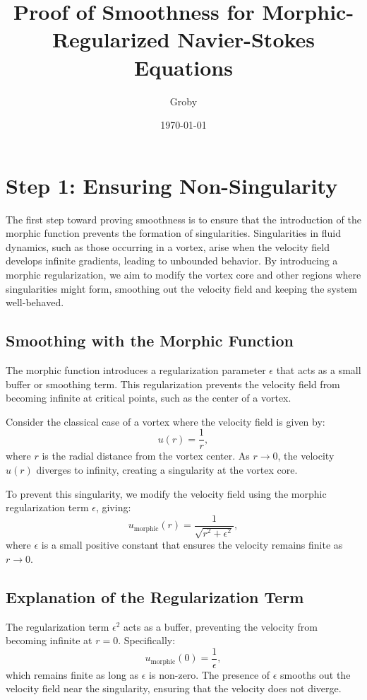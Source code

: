 \documentclass{article}
\title{Proof of Smoothness for Morphic-Regularized Navier-Stokes Equations}
\author{Groby}
\date{\today}
\begin{document}
\maketitle
\section*{Step 1: Ensuring Non-Singularity}

The first step toward proving smoothness is to ensure that the introduction of the morphic function prevents the formation of singularities. Singularities in fluid dynamics, such as those occurring in a vortex, arise when the velocity field develops infinite gradients, leading to unbounded behavior. By introducing a morphic regularization, we aim to modify the vortex core and other regions where singularities might form, smoothing out the velocity field and keeping the system well-behaved.

\subsection*{Smoothing with the Morphic Function}

The morphic function introduces a regularization parameter \( \epsilon \) that acts as a small buffer or smoothing term. This regularization prevents the velocity field from becoming infinite at critical points, such as the center of a vortex.

Consider the classical case of a vortex where the velocity field is given by:
\[
u(r) = \frac{1}{r},
\]
where \( r \) is the radial distance from the vortex center. As \( r \to 0 \), the velocity \( u(r) \) diverges to infinity, creating a singularity at the vortex core.

To prevent this singularity, we modify the velocity field using the morphic regularization term \( \epsilon \), giving:
\[
u_{\text{morphic}}(r) = \frac{1}{\sqrt{r^2 + \epsilon^2}},
\]
where \( \epsilon \) is a small positive constant that ensures the velocity remains finite as \( r \to 0 \).

\subsection*{Explanation of the Regularization Term}

The regularization term \( \epsilon^2 \) acts as a buffer, preventing the velocity from becoming infinite at \( r = 0 \). Specifically:
\[
u_{\text{morphic}}(0) = \frac{1}{\epsilon},
\]
which remains finite as long as \( \epsilon \) is non-zero. The presence of \( \epsilon \) smooths out the velocity field near the singularity, ensuring that the velocity does not diverge.
\end{document}
